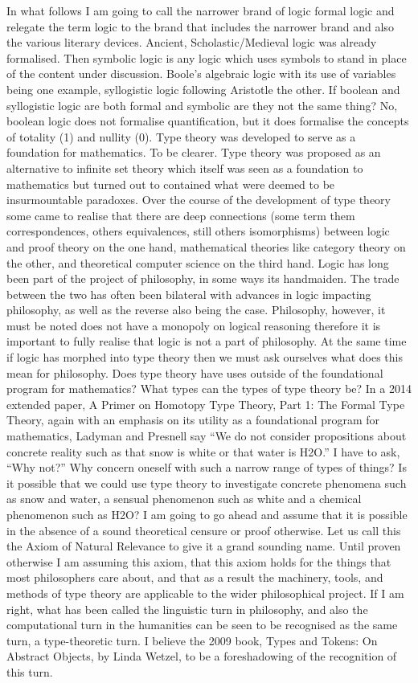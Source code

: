 \documentclass[dah,phd,a4paper]{xe_uccthesis}
\begin{document}
In what follows I am going to call the narrower brand of logic formal logic and relegate the term logic to the brand that includes the narrower brand and also the various literary devices. Ancient, Scholastic/Medieval logic was already formalised. Then symbolic logic is any logic which uses symbols to stand in place of the content under discussion. Boole's algebraic logic with its use of variables being one example, syllogistic logic following Aristotle the other. If boolean and syllogistic logic are both formal and symbolic are they not the same thing? No, boolean logic does not formalise quantification, but it does formalise the concepts of totality (1) and nullity (0).
Type theory was developed to serve as a foundation for mathematics. To be clearer. Type theory was proposed as an alternative to infinite set theory which itself was seen as a foundation to mathematics but turned out to contained what were deemed to be insurmountable paradoxes. Over the course of the development of type theory some came to realise that there are deep connections (some term them correspondences, others equivalences, still others isomorphisms) between logic and proof theory on the one hand, mathematical theories like category theory on the other, and theoretical computer science on the third hand.
Logic has long been part of the project of philosophy, in some ways its handmaiden. The trade between the two has often been bilateral with advances in logic impacting philosophy, as well as the reverse also being the case. Philosophy, however, it must be noted does not have a monopoly on logical reasoning therefore it is important to fully realise that logic is not a part of philosophy. At the same time if logic has morphed into type theory then we must ask ourselves what does this mean for philosophy. Does type theory have uses outside of the foundational program for mathematics? What types can the types of type theory be?
In a 2014 extended paper, A Primer on Homotopy Type Theory, Part 1: The Formal Type Theory, again with an emphasis on its utility as a foundational program for mathematics, Ladyman and Presnell say “We do not consider propositions about concrete reality such as that snow is white or that water is H2O.” I have to ask, “Why not?” Why concern oneself with such a narrow range of types of things? Is it possible that we could use type theory to investigate concrete phenomena such as snow and water, a sensual phenomenon such as white and a chemical phenomenon such as H2O? I am going to go ahead and assume that it is possible in the absence of a sound theoretical censure or proof otherwise. Let us call this the Axiom of Natural Relevance to give it a grand sounding name. Until proven otherwise I am assuming this axiom, that this axiom holds for the things that most philosophers care about, and that as a result the machinery, tools, and methods of type theory are applicable to the wider philosophical project. If I am right, what has been called the linguistic turn in philosophy, and also the computational turn in the humanities can be seen to be recognised as the same turn, a type-theoretic turn. I believe the 2009 book, Types and Tokens: On Abstract Objects, by Linda Wetzel, to be a foreshadowing of the recognition of this turn.
\end{document}
